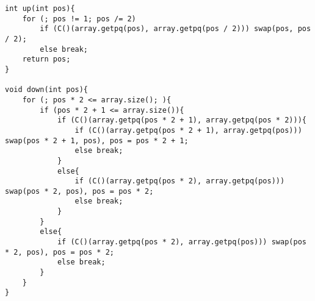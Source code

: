 \begin{lstlisting}
int up(int pos){
	for (; pos != 1; pos /= 2)
		if (C()(array.getpq(pos), array.getpq(pos / 2))) swap(pos, pos / 2);
		else break;
	return pos;
}

void down(int pos){
	for (; pos * 2 <= array.size(); ){
		if (pos * 2 + 1 <= array.size()){
			if (C()(array.getpq(pos * 2 + 1), array.getpq(pos * 2))){
				if (C()(array.getpq(pos * 2 + 1), array.getpq(pos))) swap(pos * 2 + 1, pos), pos = pos * 2 + 1;
				else break;
			}
			else{
				if (C()(array.getpq(pos * 2), array.getpq(pos))) swap(pos * 2, pos), pos = pos * 2;
				else break;
			}
		}
		else{
			if (C()(array.getpq(pos * 2), array.getpq(pos))) swap(pos * 2, pos), pos = pos * 2;
			else break;
		}
	}
}
\end{lstlisting}

